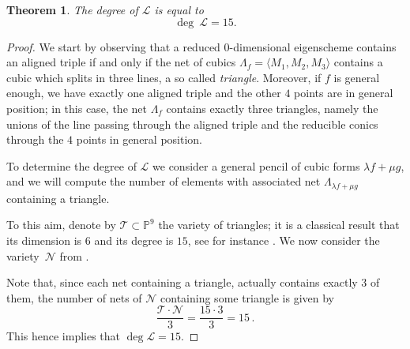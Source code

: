 \documentclass[12pt, a4paper, reqno, captions=tableheading,bibliography=totoc]{scrartcl}
\theoremstyle{plain}
\newtheorem{theorem}[lemma]{Theorem}
\theoremstyle{definition}
\newcommand{\p}{\mathbb{P}}
\newcommand{\comment}[1]{}
\begin{document}
\begin{theorem}
The degree of $\mathcal L$ is equal to
\[
  \deg \ \mathcal L =  15.
\]
\end{theorem}

\begin{proof}
We start by observing that a reduced $0$-dimensional eigenscheme contains an aligned triple if and only if the net of cubics $\Lambda_f = \langle M_1, M_2, M_3 \rangle$ contains a cubic which splits in three lines, a so called \emph{triangle}. Moreover, if $f$ is general enough, we have exactly one aligned triple and the other $4$ points are in general position; in this case, the net $\Lambda_f$ contains exactly three triangles, namely the unions of the line passing through the aligned triple and the reducible conics through the $4$ points in general position.

To determine the degree of $\mathcal L$ we consider a general pencil of cubic forms $\lambda f + \mu g$, and we will compute the number of elements with associated net $\Lambda_{\lambda f + \mu g}$ containing a triangle.

To this aim, denote by ${\mathcal T} \subset \p^9$ the variety of triangles; it is a classical result that its dimension is $6$ and its degree is $15$,
see for instance \cite[Section 2.2.2]{3264}. We now consider the variety~${\mathcal N}$ from .
\comment{
given by the union of the nets of cubics of the pencil
$$
{\mathcal N} = \bigcup_{(\lambda : \mu) \in \p^1} \Lambda_{\lambda f + \mu g} \subset \p^9.
$$
Observe that we can assume that ${\mathcal N}$ is an embedding of a rational projective bundle; indeed, it can be seen as an immersion of the $\p^2$-bundle over $\p^1$ given by the family the planes ${\mathcal P}=
\{\Lambda_{\lambda f + \mu g}\ : \ (\lambda:\mu)\in \p^1\} \subset \p^1 \times \p^9$. The map ${\mathcal P} \to {\mathcal N}$ contracts no subvariety of any plane of ${\mathcal P}$, so it is either an embedding or it contracts some horizontal curve. In the latter case, all the planes of the family should intersect in at least one point. In particular, the two nets $\Lambda_f$ and $\Lambda_g$ should have non-empty intersection.
If we denote by $M_1$, $M_2$ and $M_3$ the $2 \times 2$ minors relative to $f$, and by $N_1$, $N_2$ and $N_3$ the ones relative to $g$, the vectorial dimension of the linear span
$\langle M_1,M_2,M_3,N_1,N_2,N_3
\rangle$ should be strictly less than $6$. This can be avoided, since such a condition corresponds to a proper closed subscheme of $\p^9 \times \p^9$.

It follows that if ${\mathcal N}$ is general enough, it is a $3$-dimensional rational normal scroll in $\p(\langle M_1,M_2,M_3,N_1,N_2,N_3
\rangle) \cong \p^5$, and being a variety of minimal degree, its degree is $\deg {\mathcal N}=5+1-3=3$.
}
Note that, since each net containing a triangle, actually contains exactly $3$ of them, the number of nets of ${\mathcal N}$ containing some triangle is given by
%
\[
\frac {{\mathcal T} \cdot {\mathcal N}}{3} =\frac{{15} \cdot {3}}{3}=15 \,.
\]
%
This hence implies that $\deg {\mathcal L} = 15$.
\end{proof}
\end{document}
